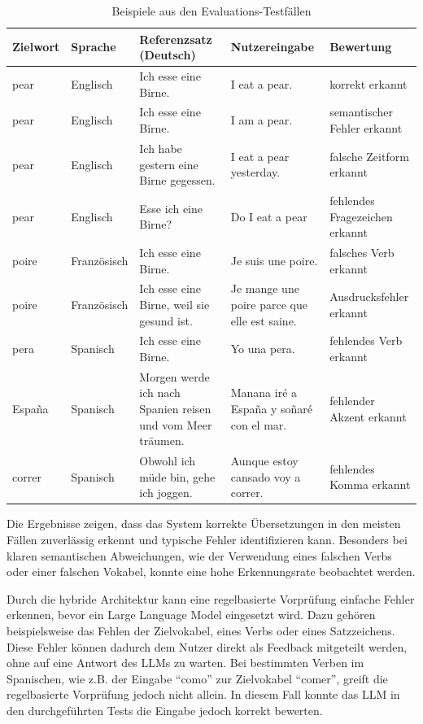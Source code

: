 \begin{table}[htbp]
\centering
\begin{tabularx}{\textwidth}{|l|l|X|X|X|}
\hline
\textbf{Zielwort} & \textbf{Sprache} & \textbf{Referenzsatz (Deutsch)} & \textbf{Nutzereingabe} & \textbf{Bewertung} \\
\hline
pear & Englisch & Ich esse eine Birne. & I eat a pear. & korrekt erkannt \\
\hline
pear & Englisch & Ich esse eine Birne. & I am a pear. & semantischer Fehler erkannt \\
\hline
pear & Englisch & Ich habe gestern eine Birne gegessen. & I eat a pear yesterday. & falsche Zeitform erkannt \\
\hline
pear & Englisch & Esse ich eine Birne? & Do I eat a pear & fehlendes Fragezeichen erkannt \\
\hline
poire & Französisch & Ich esse eine Birne. & Je suis une poire. & falsches Verb erkannt \\
\hline
poire & Französisch & Ich esse eine Birne, weil sie gesund ist. & Je mange une poire parce que elle est saine. & Ausdrucksfehler erkannt \\
\hline
pera & Spanisch & Ich esse eine Birne. & Yo una pera. & fehlendes Verb erkannt \\
\hline
España & Spanisch & Morgen werde ich nach Spanien reisen und vom Meer träumen. & Manana iré a España y soñaré con el mar. & fehlender Akzent erkannt \\
\hline
correr & Spanisch & Obwohl ich müde bin, gehe ich joggen. & Aunque estoy cansado voy a correr. & fehlendes Komma erkannt \\
\hline
\end{tabularx}
\caption{Beispiele aus den Evaluations-Testfällen}
\label{tabelle_evaluator_beispiele}
\end{table}

Die Ergebnisse zeigen, dass das System korrekte Übersetzungen in den meisten Fällen zuverlässig erkennt und typische Fehler identifizieren kann.
Besonders bei klaren semantischen Abweichungen, wie der Verwendung eines falschen Verbs oder einer falschen Vokabel, konnte eine hohe Erkennungsrate beobachtet werden.

Durch die hybride Architektur kann eine regelbasierte Vorprüfung einfache Fehler erkennen, bevor ein Large Language Model
eingesetzt wird. Dazu gehören beispielsweise das Fehlen der Zielvokabel, eines Verbs oder eines Satzzeichens. Diese Fehler können dadurch dem Nutzer direkt als Feedback mitgeteilt werden, ohne auf eine Antwort des LLMs zu warten.
Bei bestimmten Verben im Spanischen, wie z.B. der Eingabe \enquote{como} zur Zielvokabel \enquote{comer}, greift die regelbasierte Vorprüfung jedoch nicht allein. In diesem Fall konnte das LLM in den durchgeführten Tests
die Eingabe jedoch korrekt bewerten.

